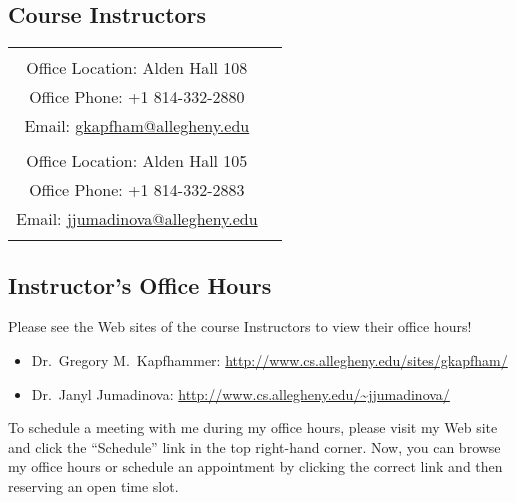 


\subsection*{Course Instructors}

\begin{tabular}{c c}

\begin{minipage}{4in} 
Dr.\ Gregory M.\ Kapfhammer\\
\noindent Office Location: Alden Hall 108 \\
\noindent Office Phone: +1 814-332-2880 \\
\noindent Email: \url{gkapfham@allegheny.edu} \\
\end{minipage} & 

\begin{minipage}{4in} 
Dr.\ Janyl Jumadinova\\
\noindent Office Location: Alden Hall 105 \\
\noindent Office Phone: +1 814-332-2883 \\
\noindent Email: \url{jjumadinova@allegheny.edu} \\
\end{minipage} 

\end{tabular}

\subsection*{Instructor's Office Hours}

Please see the Web sites of the course Instructors to view their office
hours!

\begin{itemize}
	\itemsep 0em
        \item Dr.\ Gregory M.\ Kapfhammer: \url{http://www.cs.allegheny.edu/sites/gkapfham/}
        \item Dr.\ Janyl Jumadinova: \url{http://www.cs.allegheny.edu/~jjumadinova/} 
\end{itemize}

\noindent To schedule a meeting with me during my office hours, please visit my Web site and click the ``Schedule'' link
in the top right-hand corner. Now, you can browse my office hours or schedule an appointment by clicking the correct
link and then reserving an open time slot.  

